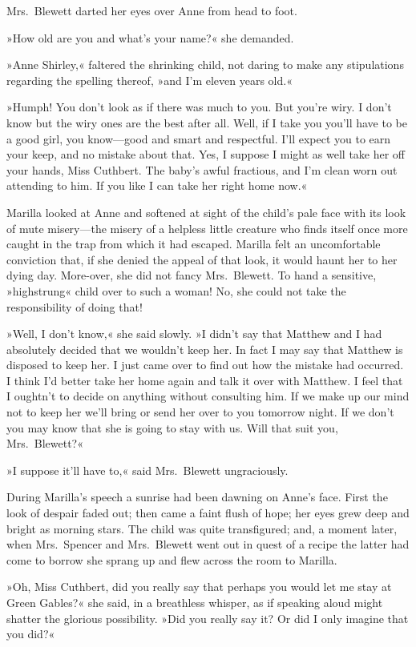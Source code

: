 Mrs.~Blewett darted her eyes over Anne from head to foot.

»How old are you and what's your name?« she demanded.

»Anne Shirley,« faltered the shrinking child, not daring to make any stipulations regarding the spelling thereof, »and I'm eleven years old.«

»Humph! You don't look as if there was much to you. But you're wiry. I don't know but the wiry ones are the best after all. Well, if I take you you'll have to be a good girl, you know—good and smart and respectful. I'll expect you to earn your keep, and no mistake about that. Yes, I suppose I might as well take her off your hands, Miss Cuthbert. The baby's awful fractious, and I'm clean worn out attending to him. If you like I can take her right home now.«

Marilla looked at Anne and softened at sight of the child's pale face with its look of mute misery—the misery of a helpless little creature who finds itself once more caught in the trap from which it had escaped. Marilla felt an uncomfortable conviction that, if she denied the appeal of that look, it would haunt her to her dying day. More-over, she did not fancy Mrs.~Blewett. To hand a sensitive, »highstrung« child over to such a woman! No, she could not take the responsibility of doing that!

»Well, I don't know,« she said slowly. »I didn't say that Matthew and I had absolutely decided that we wouldn't keep her. In fact I may say that Matthew is disposed to keep her. I just came over to find out how the mistake had occurred. I think I'd better take her home again and talk it over with Matthew. I feel that I oughtn't to decide on anything without consulting him. If we make up our mind not to keep her we'll bring or send her over to you tomorrow night. If we don't you may know that she is going to stay with us. Will that suit you, Mrs.~Blewett?«

»I suppose it'll have to,« said Mrs.~Blewett ungraciously.

During Marilla's speech a sunrise had been dawning on Anne's face. First the look of despair faded out; then came a faint flush of hope; her eyes grew deep and bright as morning stars. The child was quite transfigured; and, a moment later, when Mrs.~Spencer and Mrs.~Blewett went out in quest of a recipe the latter had come to borrow she sprang up and flew across the room to Marilla.

»Oh, Miss Cuthbert, did you really say that perhaps you would let me stay at Green Gables?« she said, in a breathless whisper, as if speaking aloud might shatter the glorious possibility. »Did you really say it? Or did I only imagine that you did?«


